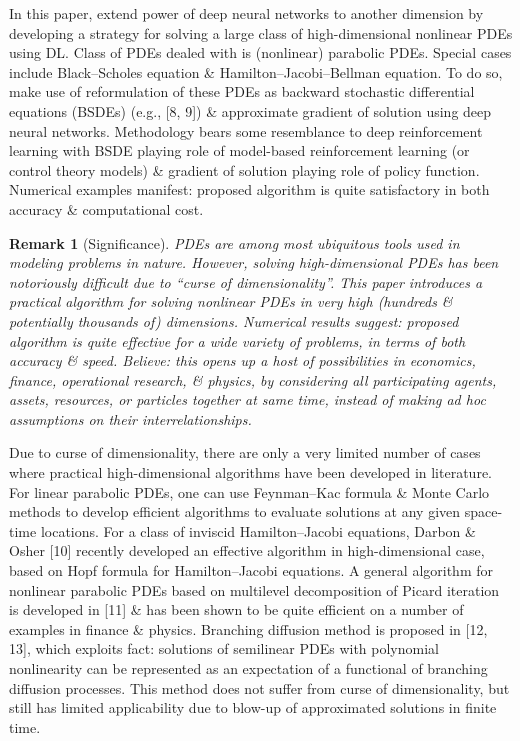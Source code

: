 \documentclass{article}
\newtheorem{remark}{Remark}
\begin{document}
\begin{itemize}
	In this paper, extend power of deep neural networks to another dimension by developing a strategy for solving a large class of high-dimensional nonlinear PDEs using DL. Class of PDEs dealed with is (nonlinear) parabolic PDEs. Special cases include Black--Scholes equation \& Hamilton--Jacobi--Bellman equation. To do so, make use of reformulation of these PDEs as backward stochastic differential equations (BSDEs) (e.g., [8, 9]) \& approximate gradient of solution using deep neural networks. Methodology bears some resemblance to deep reinforcement learning with BSDE playing role of model-based reinforcement learning (or control theory models) \& gradient of solution playing role of policy function. Numerical examples manifest: proposed algorithm is quite satisfactory in both accuracy \& computational cost.
	\begin{remark}[Significance]
		PDEs are among most ubiquitous tools used in modeling problems in nature. However, solving high-dimensional PDEs has been notoriously difficult due to ``curse of dimensionality''. This paper introduces a practical algorithm for solving nonlinear PDEs in very high (hundreds \& potentially thousands of) dimensions. Numerical results suggest: proposed algorithm is quite effective for a wide variety of problems, in terms of both accuracy \& speed. Believe: this opens up a host of possibilities in economics, finance, operational research, \& physics, by considering all participating agents, assets, resources, or particles together at same time, instead of making ad hoc assumptions on their interrelationships.
	\end{remark}
	Due to curse of dimensionality, there are only a very limited number of cases where practical high-dimensional algorithms have been developed in literature. For linear parabolic PDEs, one can use Feynman--Kac formula \& Monte Carlo methods to develop efficient algorithms to evaluate solutions at any given space-time locations. For a class of inviscid Hamilton--Jacobi equations, Darbon \& Osher [10] recently developed an effective algorithm in high-dimensional case, based on Hopf formula for Hamilton--Jacobi equations. A general algorithm for nonlinear parabolic PDEs based on multilevel decomposition of Picard iteration is developed in [11] \& has been shown to be quite efficient  on a number of examples in finance \& physics. Branching diffusion method is proposed in [12, 13], which exploits fact: solutions of semilinear PDEs with polynomial nonlinearity can be represented as an expectation of a functional of branching diffusion processes. This method does not suffer from curse of dimensionality, but still has limited applicability due to blow-up of approximated solutions in finite time.


\end{itemize}
\end{document}
